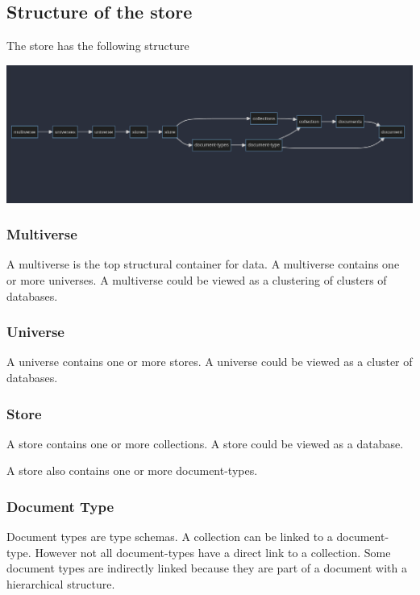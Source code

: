 \documentclass[11pt]{article}
\begin{document}
\subsection{Structure of the store}
\label{sec:org7f4f68a}

The store has the following structure 

\begin{center}
\includegraphics[width=.9\linewidth]{multiverse.png}
\end{center}

\subsubsection{Multiverse}
\label{sec:org00eb225}

A multiverse is the top structural container for data. A multiverse
contains one or more universes. A multiverse could be viewed as a
clustering of clusters of databases.

\subsubsection{Universe}
\label{sec:org1091a2f}

A universe contains one or more stores. A universe could be viewed as
a cluster of databases.

\subsubsection{Store}
\label{sec:org425c26f}

A store contains one or more collections. A store could be viewed as a database.

A store also contains one or more document-types.

\subsubsection{Document Type}
\label{sec:org264c208}

Document types are type schemas. A collection can be linked to a document-type. However
not all document-types have a direct link to a collection. Some
document types are indirectly linked because they are part of a
document with a hierarchical structure.
\end{document}
